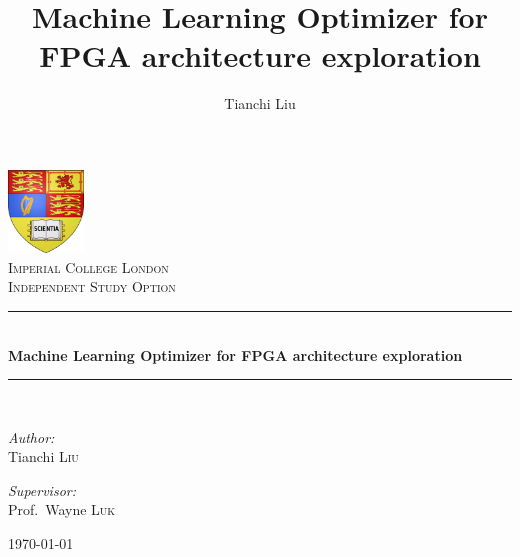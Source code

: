 \documentclass[12pt, runningheads,a4paper]{llncs}
\newcommand{\HRule}{\rule{\linewidth}{0.5mm}}
\begin{document}
\thispagestyle{empty}
\begin{center}
\includegraphics[width=0.15\textwidth]{imperial-college-london-logo.png}~\\[1cm]
\textsc{\LARGE Imperial College London}\\[1.5cm]

\textsc{\Large Independent Study Option}\\[0.5cm]

\HRule \\[0.4cm]
{ \huge \bfseries Machine Learning Optimizer for FPGA architecture exploration}\\[0.4cm]

\HRule \\[1.5cm]

\begin{minipage}{0.4\textwidth}
\begin{flushleft} \large
\emph{Author:}\\
Tianchi \textsc{Liu}
\end{flushleft}
\end{minipage}
\begin{minipage}{0.4\textwidth}
\begin{flushright} \large
\emph{Supervisor:} \\
Prof.~Wayne \textsc{Luk}
\end{flushright}
\end{minipage}

\vfill

{\large \today}

\end{center}



\setcounter{page}{1}
\title{Machine Learning Optimizer for FPGA architecture exploration}


%
%
\author{Tianchi Liu}
%
\end{document}

